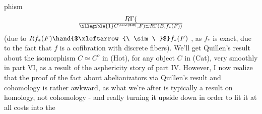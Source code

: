 phism
\[ R\Gamma(\over{\illegible{1}}{C}^{\hand{$*$}},F) \simeq R\Gamma(B,f_*(F)) \]
(due to $Rf_*(F)\hand{$\xleftarrow{\ \sim\ }$}f_*(F)$ , as $f_*$ is exact, due to the fact that $f$ is
a cofibration with discrete fibers). We'll get Quillen's result about
the isomorphism $C \simeq C^{o}$ in (Hot), for any object $C$ in (Cat), very
 smoothly in part VI, as a result of the asphericity story of part IV.
However, I now realize that the proof of the fact about abelianizators
via Quillen's result and cohomology is rather awkward, as what we're
after is typically a result on homology, not cohomology - and 
really turning it upside down in order to fit it at all costs into the


